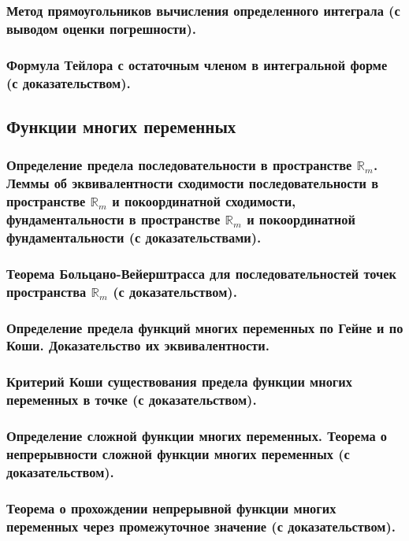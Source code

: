 \documentclass[10pt]{article}
\begin{document}
    \subsubsection{Метод прямоугольников вычисления определенного интеграла (с выводом оценки погрешности).}
    \subsubsection{Формула Тейлора с остаточным членом в интегральной форме (с доказательством).}
    \subsection{Функции многих переменных}
    \subsubsection{Определение предела последовательности в пространстве \texorpdfstring{$\mathbb{R}_m$}{Rm}. Леммы об эквивалентности сходимости последовательности в пространстве \texorpdfstring{$\mathbb{R}_m$}{Rm} и покоординатной сходимости, фундаментальности в пространстве \texorpdfstring{$\mathbb{R}_m$}{Rm} и покоординатной фундаментальности (с доказательствами).}
    \subsubsection{Теорема Больцано-Вейерштрасса для последовательностей точек пространства \texorpdfstring{$\mathbb{R}_m$}{Rm} (с доказательством).}
    \subsubsection{Определение предела функций многих переменных по Гейне и по Коши. Доказательство их эквивалентности.}
    \subsubsection{Критерий Коши существования предела функции многих переменных в точке (с доказательством).}
    \subsubsection{Определение сложной функции многих переменных. Теорема о непрерывности сложной функции многих переменных (с доказательством).}
    \subsubsection{Теорема о прохождении непрерывной функции многих переменных через промежуточное значение (с доказательством).}
\end{document}
